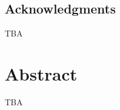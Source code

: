 \clearpage
{}
\section*{Acknowledgments}
TBA

\newpage

\chapter{Abstract}
TBA

\newpage

\tableofcontents